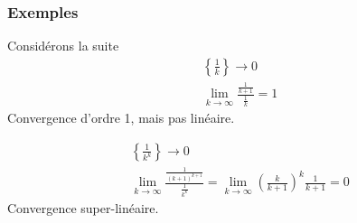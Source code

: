 \documentclass[usepdftitle=false]{beamer}
\begin{document}
\begin{frame}
\frametitle{Exemples}

Considérons la suite
\begin{align*}
& \left\lbrace \frac{1}{k} \right\rbrace \rightarrow 0\\
& \lim_{k \rightarrow \infty} \frac{\frac{1}{k+1}}{\frac{1}{k}} = 1
\end{align*}
Convergence d'ordre 1, mais pas linéaire.

\begin{align*}
& \left\lbrace \frac{1}{k^k} \right\rbrace \rightarrow 0\\
& \lim_{k \rightarrow \infty} \frac{\frac{1}{(k+1)^{k+1}}}{\frac{1}{k^k}}
  = \lim_{k \rightarrow \infty} \left( \frac{k}{k+1} \right)^k \frac{1}{k+1} 
  = 0
\end{align*}
Convergence super-linéaire.

\end{frame}
\end{document}
